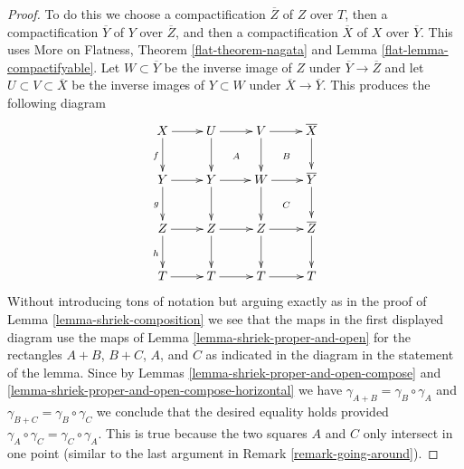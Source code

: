 \documentclass{stacks-project}
\theoremstyle{plain}
\theoremstyle{definition}
\theoremstyle{remark}
\numberwithin{equation}{subsection}
\begin{document}
\begin{proof}
To do this we choose a compactification $\overline{Z}$
of $Z$ over $T$, then a compactification $\overline{Y}$ of $Y$ over
$\overline{Z}$, and then a compactification $\overline{X}$ of
$X$ over $\overline{Y}$. This uses
More on Flatness, Theorem \ref{flat-theorem-nagata} and
Lemma \ref{flat-lemma-compactifyable}.
Let $W \subset \overline{Y}$ be the inverse image of $Z$ under
$\overline{Y} \to \overline{Z}$ and let $U \subset V \subset \overline{X}$
be the inverse images of $Y \subset W$ under $\overline{X} \to \overline{Y}$.
This produces the following diagram
$$
\xymatrix{
X \ar[d]_f \ar[r] & U \ar[r] \ar[d] \ar@{}[dr]|A &
V \ar[d] \ar[r] \ar@{}[rd]|B & \overline{X} \ar[d] \\
Y \ar[d]_g \ar[r] & Y \ar[r] \ar[d] & W \ar[r] \ar[d] \ar@{}[rd]|C &
\overline{Y} \ar[d] \\
Z \ar[d]_h \ar[r] & Z \ar[d] \ar[r] & Z \ar[d] \ar[r] & \overline{Z} \ar[d] \\
T \ar[r] & T \ar[r] & T \ar[r] & T
}
$$
Without introducing tons of notation but arguing exactly
as in the proof of Lemma \ref{lemma-shriek-composition}
we see that the maps in the first displayed diagram use the
maps of Lemma \ref{lemma-shriek-proper-and-open} for the rectangles
$A + B$, $B + C$, $A$, and $C$ as indicated in the diagram in
the statement of the lemma. Since by
Lemmas \ref{lemma-shriek-proper-and-open-compose} and
\ref{lemma-shriek-proper-and-open-compose-horizontal}
we have $\gamma_{A + B} = \gamma_B \circ \gamma_A$ and
$\gamma_{B + C} = \gamma_B \circ \gamma_C$ we conclude
that the desired equality holds provided
$\gamma_A \circ \gamma_C = \gamma_C \circ \gamma_A$.
This is true because the two squares $A$ and $C$ only
intersect in one point (similar to the last argument in
Remark \ref{remark-going-around}).
\end{proof}
\end{document}

